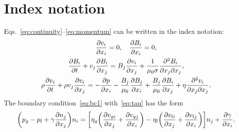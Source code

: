 \documentclass{article}
\begin{document}
\appendix

\section{Index notation}

Eqs.~\eqref{eq:continuity}--\eqref{eq:momentum} can be written in the index notation:
\begin{gather}
    \pdv{v_i}{x_i} = 0, \quad \pdv{B_i}{x_i} = 0, \label{eq:continuityI}\\
    \pdv{B_i}{t} + v_j\pdv{B_i}{x_j} = B_j\pdv{v_i}{x_j} + \frac1{\mu_0\sigma} \pdv[2]{B_i}{x_j}{x_j}, \label{eq:BI}\\
    \rho\pdv{v_i}{t} + \rho v_j\pdv{v_i}{x_j}
    = -\pdv{p}{x_i} - \frac{B_j}{\mu_0}\pdv{B_j}{x_i} + \frac{B_j}{\mu_0}\pdv{B_i}{x_j} + \eta\pdv[2]{v_i}{x_j}{x_j}. \label{eq:momentumI}
\end{gather}
The boundary condition~\eqref{eq:bc1} with~\eqref{eq:tau} has the form
\begin{equation}\label{eq:bc1I}
    \qty(p_g - p_l + \gamma\pdv{n_j}{x_j})n_i
    = \qty[
        \eta_g\qty( \pdv{v_{gi}}{x_j} + \pdv{v_{gj}}{x_i} )
      - \eta_l\qty( \pdv{v_{li}}{x_j} + \pdv{v_{lj}}{x_i} )
    ]n_j + \pdv{\gamma}{x_i}.
\end{equation}

\printbibliography
\end{document}
